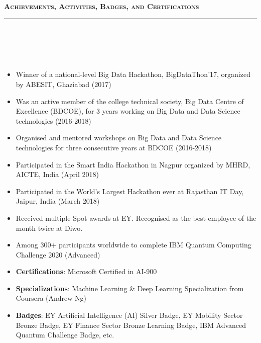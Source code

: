 \documentclass[a4paper,10pt]{article}
\newcommand{\isep}{-2 pt}
\newcommand{\lsep}{-0.5cm}
\newcommand{\resheading}[1]{{\small
        {
            \begin{minipage}
                {0.992\textwidth}\textbf{{\textsc{#1 \vphantom{p\^{E}} }}}
                \\[-0.3cm]
                \hrule
            \end{minipage}
            \\[-0.5cm]
        }
 }}
\begin{document}
\vspace{4pt}
\noindent
\resheading{\textbf{\large Achievements, Activities, Badges, and Certifications}}\\[\lsep] 
\\[-0.3cm]
\begin{itemize}\itemsep \isep

\item Winner of a national-level Big Data Hackathon, BigDataThon’17, organized by ABESIT, Ghaziabad (2017)

\item Was an active member of the college technical society, Big Data Centre of Excellence (BDCOE), for 3 years working on Big Data and Data Science technologies (2016-2018)

\item Organised and mentored workshops on Big Data and Data Science technologies for three consecutive years at BDCOE (2016-2018)

\item Participated in the Smart India Hackathon in Nagpur organized by MHRD, AICTE, India (April 2018)

\item Participated in the World's Largest Hackathon ever at Rajasthan IT Day, Jaipur, India (March 2018)

\item Received multiple Spot awards at EY. Recognised as the best employee of the month twice at Diwo.

\item Among 300+ participants worldwide to complete IBM Quantum Computing Challenge 2020 (Advanced)

\item \textbf{Certifications}: Microsoft Certified in AI-900
\item \textbf{Specializations}: Machine Learning \& Deep Learning Specialization from Coursera (Andrew Ng)
\item \textbf{Badges}: EY Artificial Intelligence (AI) Silver Badge, EY Mobility Sector Bronze Badge, EY Finance Sector Bronze Learning Badge, IBM Advanced Quantum Challenge Badge, etc.
    
	
\end{itemize}
\end{document}
